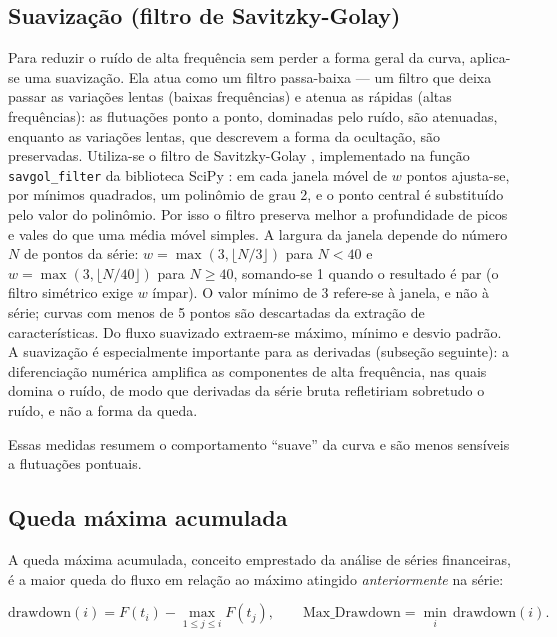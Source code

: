 \subsection{Suavização (filtro de Savitzky-Golay)}
\label{sec:suavizacao}

Para reduzir o ruído de alta frequência sem perder a forma geral da curva, aplica-se uma suavização. Ela atua como um filtro passa-baixa --- um filtro que deixa passar as variações lentas (baixas frequências) e atenua as rápidas (altas frequências): as flutuações ponto a ponto, dominadas pelo ruído, são atenuadas, enquanto as variações lentas, que descrevem a forma da ocultação, são preservadas. Utiliza-se o filtro de Savitzky-Golay \citep{SavitzkyGolay1964}, implementado na função \texttt{savgol\_filter} da biblioteca SciPy \citep{SciPy2020}: em cada janela móvel de \(w\) pontos ajusta-se, por mínimos quadrados, um polinômio de grau 2, e o ponto central é substituído pelo valor do polinômio. Por isso o filtro preserva melhor a profundidade de picos e vales do que uma média móvel simples. A largura da janela depende do número \(N\) de pontos da série: \(w = \max(3, \lfloor N/3 \rfloor)\) para \(N < 40\) e \(w = \max(3, \lfloor N/40 \rfloor)\) para \(N \geq 40\), somando-se 1 quando o resultado é par (o filtro simétrico exige \(w\) ímpar). O valor mínimo de 3 refere-se à janela, e não à série; curvas com menos de 5 pontos são descartadas da extração de características. Do fluxo suavizado extraem-se máximo, mínimo e desvio padrão. A suavização é especialmente importante para as derivadas (subseção seguinte): a diferenciação numérica amplifica as componentes de alta frequência, nas quais domina o ruído, de modo que derivadas da série bruta refletiriam sobretudo o ruído, e não a forma da queda.

Essas medidas resumem o comportamento ``suave'' da curva e são menos sensíveis a flutuações pontuais.

\subsection{Queda máxima acumulada}

A queda máxima acumulada, conceito emprestado da análise de séries financeiras, é a maior queda do fluxo em relação ao máximo atingido \emph{anteriormente} na série:

\begin{equation}
\mathrm{drawdown}(i) = F(t_i) - \max_{1 \leq j \leq i} F(t_j), \qquad
\mathrm{Max\_Drawdown} = \min_i \, \mathrm{drawdown}(i).
\end{equation}

